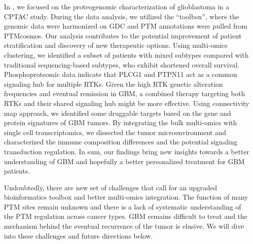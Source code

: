 In , we focused on the proteogenomic characterization of glioblastoma in a CPTAC study. During the data analysis, we utilized the ``toolbox'', where the genomic data were harmonized on GDC and PTM annotations were pulled from PTMcosmos. Our analysis contributes to the potential improvement of patient stratification and discovery of new therapeutic options. Using multi-omics clustering, we identified a subset of patients with mixed subtypes compared with traditional sequencing-based subtypes, who exhibit shortened overall survival. Phosphoproteomic data indicate that PLCG1 and PTPN11 act as a common signaling hub for multiple RTKs. Given the high RTK genetic alteration frequencies and eventual remission in GBM, a combined therapy targeting both RTKs and their shared signaling hub might be more effective. Using connectivity map approach, we identified some druggable targets based on the gene and protein signatures of GBM tumors. By integrating the bulk multi-omics with single cell transcriptomics, we dissected the tumor microenvironment and characterized the immune composition differences and the potential signaling transduction regulation. In sum, our findings bring new insights towards a better understanding of GBM and hopefully a better personalized treatment for GBM patients.

Undoubtedly, there are new set of challenges that call for an upgraded bioinformatics toolbox and better multi-omics integration. The function of many PTM sites remain unknown and there is a lack of systematic understanding of the PTM regulation across cancer types. GBM remains difficult to treat and the mechanism behind the eventual recurrence of the tumor is elusive. We will dive into these challenges and future directions below.


